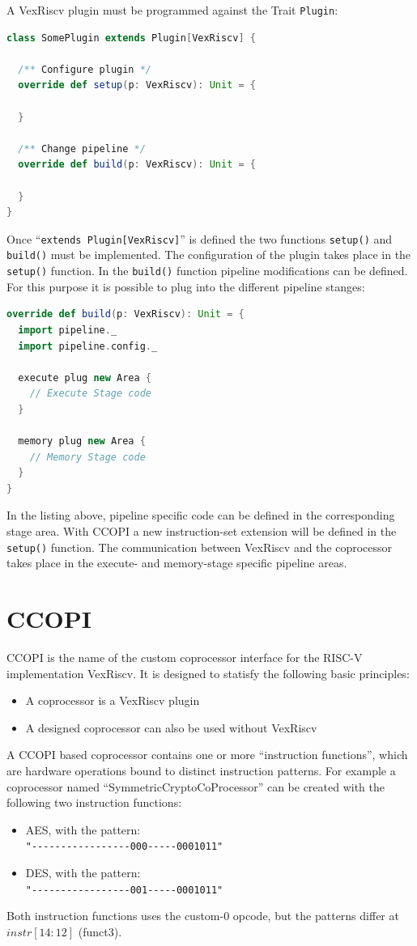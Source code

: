 \documentclass[twoside,twocolumn]{article}
\newcommand{\code}[1]{\texttt{#1}}
\begin{document}
A VexRiscv plugin must be programmed against the Trait \code{Plugin}:
\begin{lstlisting}[language=scala]
class SomePlugin extends Plugin[VexRiscv] {

  /** Configure plugin */
  override def setup(p: VexRiscv): Unit = {
  
  }
  
  /** Change pipeline */
  override def build(p: VexRiscv): Unit = {
  
  }
}
\end{lstlisting}
\noindent Once ``\code{extends Plugin[VexRiscv]}'' is defined the two
functions \code{setup()} and \code{build()} must be implemented. The
configuration of the plugin takes place in the \code{setup()} function.
In the \code{build()} function pipeline modifications can be defined.
For this purpose it is possible to plug into the different pipeline
stanges:
\begin{lstlisting}[language=scala]
override def build(p: VexRiscv): Unit = {
  import pipeline._
  import pipeline.config._

  execute plug new Area {
    // Execute Stage code
  }

  memory plug new Area {
    // Memory Stage code
  }
}
\end{lstlisting}
In the listing above, pipeline specific code can be defined in the
corresponding stage area. With CCOPI a new instruction-set extension
will be defined in the \code{setup()} function. The communication
between VexRiscv and the coprocessor takes place in the execute- and
memory-stage specific pipeline areas.

\section{CCOPI}
CCOPI is the name of the custom coprocessor interface for the RISC-V
implementation VexRiscv. It is designed to statisfy the following basic
principles:
\begin{itemize}
    \item A coprocessor is a VexRiscv plugin
    \item A designed coprocessor can also be used without VexRiscv
\end{itemize}
A CCOPI based coprocessor contains one or more ``instruction
functions'', which are hardware operations bound to distinct
instruction patterns. For example a coprocessor named
``SymmetricCryptoCoProcessor'' can be created with the following two
instruction functions:
\begin{itemize}
    \item AES, with the pattern:\\ \code{"-{}-{}-{}-{}-{}-{}-{}-{}-{}-{}-{}-{}-{}-{}-{}-{}-{}000-{}-{}-{}-{}-{}0001011"} 
    \item DES, with the pattern: \\ \code{"-{}-{}-{}-{}-{}-{}-{}-{}-{}-{}-{}-{}-{}-{}-{}-{}-{}001-{}-{}-{}-{}-{}0001011"}
\end{itemize}
Both instruction functions uses the custom-0 opcode, but the patterns
differ at $instr[14:12]$ (funct3).
\end{document}
